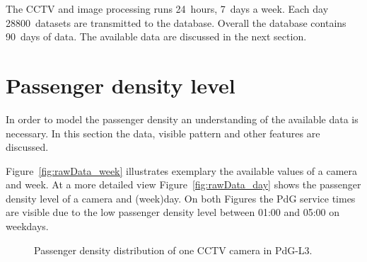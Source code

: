The CCTV and image processing runs 24~hours, 7~days a week. Each day 28800~datasets are transmitted to the database. Overall the database contains 90~days of data. The available data are discussed in the next section.


\section{Passenger density level}
\label{sec:PassengerDensityLevel}

In order to model the passenger density an understanding of the available data is necessary. In this section the data, visible pattern and other features are discussed.

Figure~\ref{fig:rawData_week} illustrates exemplary the available values of a camera and week. At a more detailed view Figure~\ref{fig:rawData_day} shows the passenger density level of a camera and (week)day. On both Figures the PdG service times are visible due to the low passenger density level between 01:00 and 05:00 on weekdays.

\begin{figure}[htbp]

  \centering

  \hfill

  \caption{Passenger density distribution of one CCTV camera in PdG-L3.}
  \label{fig:rawData}

\end{figure}


